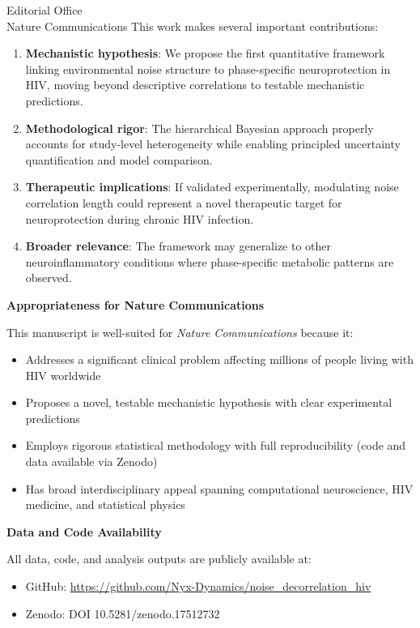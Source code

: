 \documentclass[11pt]{letter}
\begin{document}
\begin{letter}{Editorial Office\\Nature Communications}
This work makes several important contributions:

\begin{enumerate}
    \item \textbf{Mechanistic hypothesis}: We propose the first quantitative framework linking environmental noise structure to phase-specific neuroprotection in HIV, moving beyond descriptive correlations to testable mechanistic predictions.

    \item \textbf{Methodological rigor}: The hierarchical Bayesian approach properly accounts for study-level heterogeneity while enabling principled uncertainty quantification and model comparison.

    \item \textbf{Therapeutic implications}: If validated experimentally, modulating noise correlation length could represent a novel therapeutic target for neuroprotection during chronic HIV infection.

    \item \textbf{Broader relevance}: The framework may generalize to other neuroinflammatory conditions where phase-specific metabolic patterns are observed.
\end{enumerate}

\textbf{Appropriateness for Nature Communications}

This manuscript is well-suited for \textit{Nature Communications} because it:
\begin{itemize}
    \item Addresses a significant clinical problem affecting millions of people living with HIV worldwide
    \item Proposes a novel, testable mechanistic hypothesis with clear experimental predictions
    \item Employs rigorous statistical methodology with full reproducibility (code and data available via Zenodo)
    \item Has broad interdisciplinary appeal spanning computational neuroscience, HIV medicine, and statistical physics
\end{itemize}

\textbf{Data and Code Availability}

All data, code, and analysis outputs are publicly available at:
\begin{itemize}
    \item GitHub: \url{https://github.com/Nyx-Dynamics/noise_decorrelation_hiv}
    \item Zenodo: DOI 10.5281/zenodo.17512732
\end{itemize}


\end{letter}
\end{document}
